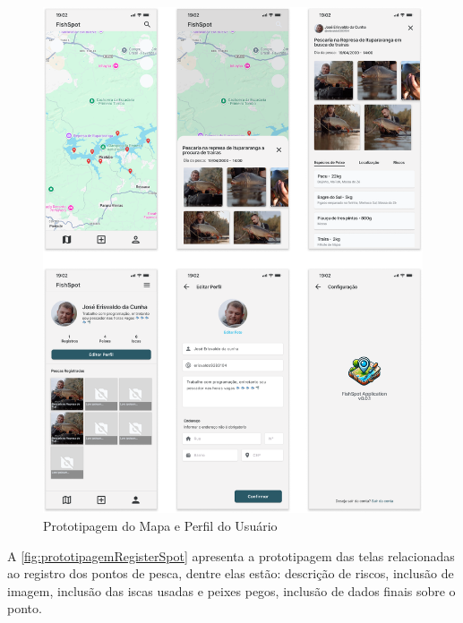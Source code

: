\begin{figure}[H]
    \centering
    \caption{Prototipagem do Mapa e Perfil do Usuário}
    \label{fig:prototipagemMapPerfil}
    \includegraphics[scale=0.29]{./dados/figuras/prototipagem-map-perfil.png}
\end{figure}

A \autoref{fig:prototipagemRegisterSpot} apresenta a prototipagem das telas relacionadas ao registro dos pontos de pesca, dentre elas estão: descrição de riscos, inclusão de imagem, inclusão das iscas usadas e peixes pegos, inclusão de dados finais sobre o ponto.

